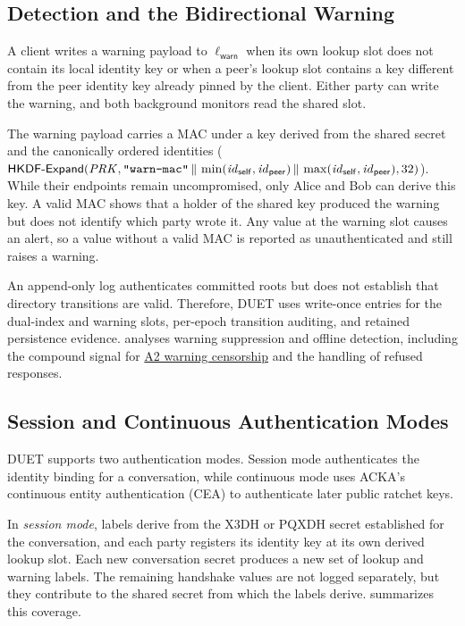 \subsection{Detection and the Bidirectional Warning}\label{ssec:design-detection}

A client writes a warning payload to $\ell_{\mathsf{warn}}$ when its own lookup slot does not
contain its local identity key or when a peer's lookup slot contains a key different from the peer
identity key already pinned by the client. Either party can write the warning, and both background
monitors read the shared slot.

The warning payload carries a MAC under a key derived from the shared secret and the canonically
ordered identities
($\mathsf{HKDF\text{-}Expand}(\mathit{PRK}, \text{\texttt{"warn-mac"}} \,\|\,
\min(\mathit{id}_{\mathsf{self}},\mathit{id}_{\mathsf{peer}}) \,\|\, \max(\mathit{id}_{\mathsf{self}},\mathit{id}_{\mathsf{peer}}), 32)$).
While their endpoints remain uncompromised, only Alice and Bob can derive this key. A valid MAC
shows that a holder of the shared key produced the warning but does not identify which party wrote
it. Any value at the warning slot causes an alert, so a value without a valid MAC is reported as
unauthenticated and still raises a warning.

An append-only log authenticates committed roots but does not establish that directory transitions
are valid. Therefore, DUET uses write-once entries for the dual-index and warning slots, per-epoch
transition auditing, and retained persistence evidence.  analyses warning
suppression and offline detection, including the compound signal for
\hyperref[sc:threat-a2]{A2 warning censorship} and the handling of refused responses.

\subsection{Session and Continuous Authentication Modes}\label{ssec:design-modes}

DUET supports two authentication modes. Session mode authenticates the identity binding for a
conversation, while continuous mode uses ACKA's continuous entity authentication (CEA) to authenticate
later public ratchet keys.

In \emph{session mode}, labels derive from the X3DH or PQXDH secret established for the conversation,
and each party registers its identity key at its own derived lookup slot. Each new conversation
secret produces a new set of lookup and warning labels. The remaining handshake values are not logged
separately, but they contribute to the shared secret from which the labels derive.
 summarizes this coverage.

